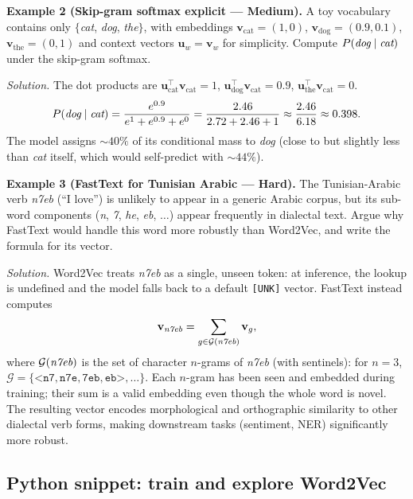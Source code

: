 \documentclass[12pt,a4paper]{report}
\theoremstyle{definition}
\theoremstyle{remark}
\begin{document}
\medskip

\textbf{Example 2 (Skip-gram softmax explicit --- Medium).}
A toy vocabulary contains only $\{$\emph{cat}, \emph{dog}, \emph{the}$\}$, with embeddings $\mathbf{v}_{\text{cat}} = (1, 0)$, $\mathbf{v}_{\text{dog}} = (0.9, 0.1)$, $\mathbf{v}_{\text{the}} = (0, 1)$ and context vectors $\mathbf{u}_w = \mathbf{v}_w$ for simplicity. Compute $P(\emph{dog} \mid \emph{cat})$ under the skip-gram softmax.

\textit{Solution.}
The dot products are $\mathbf{u}_{\text{cat}}^\top \mathbf{v}_{\text{cat}} = 1$, $\mathbf{u}_{\text{dog}}^\top \mathbf{v}_{\text{cat}} = 0.9$, $\mathbf{u}_{\text{the}}^\top \mathbf{v}_{\text{cat}} = 0$.
\[ P(\emph{dog} \mid \emph{cat}) = \frac{e^{0.9}}{e^{1} + e^{0.9} + e^{0}} = \frac{2.46}{2.72 + 2.46 + 1} \approx \frac{2.46}{6.18} \approx 0.398. \]
The model assigns $\sim 40\%$ of its conditional mass to \emph{dog} (close to but slightly less than \emph{cat} itself, which would self-predict with $\sim 44\%$).

\medskip

\textbf{Example 3 (FastText for Tunisian Arabic --- Hard).}
The Tunisian-Arabic verb \emph{n7eb} (``I love'') is unlikely to appear in a generic Arabic corpus, but its sub-word components (\emph{n}, \emph{7}, \emph{he}, \emph{eb}, $\dots$) appear frequently in dialectal text. Argue why FastText would handle this word more robustly than Word2Vec, and write the formula for its vector.

\textit{Solution.} Word2Vec treats \emph{n7eb} as a single, unseen token: at inference, the lookup is undefined and the model falls back to a default \texttt{[UNK]} vector. FastText instead computes
\[ \mathbf{v}_{\emph{n7eb}} = \sum_{g \in \mathcal{G}(\emph{n7eb})} \mathbf{v}_g, \]
where $\mathcal{G}(\emph{n7eb})$ is the set of character $n$-grams of \emph{n7eb} (with sentinels): for $n = 3$, $\mathcal{G} = \{\texttt{<n7}, \texttt{n7e}, \texttt{7eb}, \texttt{eb>}, \dots\}$. Each $n$-gram has been seen and embedded during training; their sum is a valid embedding even though the whole word is novel. The resulting vector encodes morphological and orthographic similarity to other dialectal verb forms, making downstream tasks (sentiment, NER) significantly more robust.

\subsection{Python snippet: train and explore Word2Vec}
\end{document}
